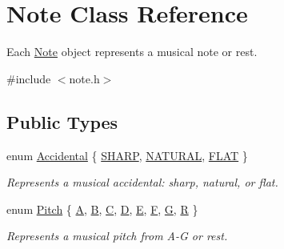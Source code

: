 \hypertarget{classNote}{}\section{Note Class Reference}
\label{classNote}


Each \mbox{\hyperlink{classNote}{Note}} object represents a musical note or rest.  




{\ttfamily \#include $<$note.\+h$>$}

\subsection*{Public Types}
\begin{DoxyCompactItemize}
\item 
enum \mbox{\hyperlink{classNote_a48ac9ae5104f19cec526c22b5323f5d9}{Accidental}} \{ \mbox{\hyperlink{classNote_a48ac9ae5104f19cec526c22b5323f5d9aad63db67a2284cd7e3ffe382b6d6ea82}{S\+H\+A\+RP}}, 
\mbox{\hyperlink{classNote_a48ac9ae5104f19cec526c22b5323f5d9a0425aaf673bebee34014367ea7c3deb1}{N\+A\+T\+U\+R\+AL}}, 
\mbox{\hyperlink{classNote_a48ac9ae5104f19cec526c22b5323f5d9a0338024d4d0d5bffed604c279f8f5550}{F\+L\+AT}}
 \}
\begin{DoxyCompactList}\small\item\em Represents a musical accidental\+: sharp, natural, or flat. \end{DoxyCompactList}\item 
enum \mbox{\hyperlink{classNote_a6753778520a0d8493f6c18f6e6818542}{Pitch}} \{ \mbox{\hyperlink{classNote_a6753778520a0d8493f6c18f6e6818542a42a4ade1acd55a49164099104990e09f}{A}}, 
\mbox{\hyperlink{classNote_a6753778520a0d8493f6c18f6e6818542a3f2a77ecd272aa6d6b5902faa5e5fc68}{B}}, 
\mbox{\hyperlink{classNote_a6753778520a0d8493f6c18f6e6818542a739ce3f516592d245d16fd8a3893472c}{C}}, 
\mbox{\hyperlink{classNote_a6753778520a0d8493f6c18f6e6818542a77a6b11f9898c052926f1d49765861e8}{D}}, 
\mbox{\hyperlink{classNote_a6753778520a0d8493f6c18f6e6818542ab199e021998d49b1f09338d8b9b18ecb}{E}}, 
\mbox{\hyperlink{classNote_a6753778520a0d8493f6c18f6e6818542af382a63cc3d6491bf26b59e66f46826d}{F}}, 
\mbox{\hyperlink{classNote_a6753778520a0d8493f6c18f6e6818542a2fe993340f6abb2234e543cd427df70b}{G}}, 
\mbox{\hyperlink{classNote_a6753778520a0d8493f6c18f6e6818542a1784b1a3d7cbd43c45ff82c72d05e4ae}{R}}
 \}
\begin{DoxyCompactList}\small\item\em Represents a musical pitch from A-\/G or rest. \end{DoxyCompactList}\end{DoxyCompactItemize}
